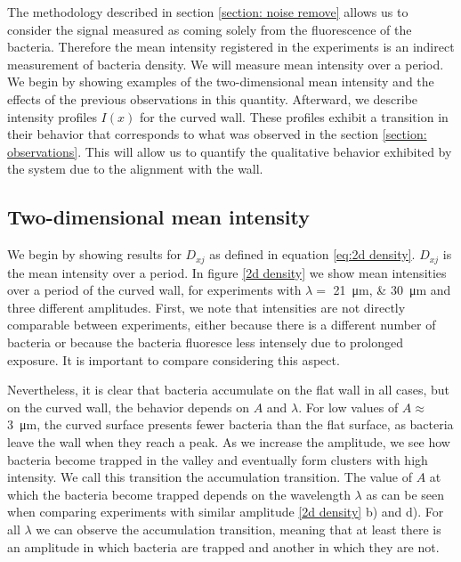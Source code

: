 The methodology described in section \ref{section: noise remove} allows us to consider the signal measured as coming solely from the fluorescence of the bacteria. Therefore the mean intensity registered in the experiments is an indirect measurement of bacteria density. We will measure mean intensity over a period. We begin by showing examples of the two-dimensional mean intensity and the effects of the previous observations in this quantity. Afterward, we describe intensity profiles $I(x)$ for the curved wall. These profiles exhibit a transition in their behavior that corresponds to what was observed in the section \ref{section: observations}. This will allow us to quantify the qualitative behavior exhibited by the system due to the alignment with the wall. 


\subsection{Two-dimensional mean intensity}

We begin by showing results for $D_{xj}$ as defined in equation \eqref{eq:2d density}. $D_{xj}$ is the mean intensity over a period. In figure \ref{2d density} we show mean intensities over a period of the curved wall, for experiments with $\lambda =$ \SIlist[list-units=single]{21;30}{\micro\meter} and three different amplitudes. First, we note that intensities are not directly comparable between experiments, either because there is a different number of bacteria or because the bacteria fluoresce less intensely due to prolonged exposure. It is important to compare considering this aspect.

Nevertheless, it is clear that bacteria accumulate on the flat wall in all cases, but on the curved wall, the behavior depends on $A$ and $\lambda$. For low values of $A\approx$ \SI{3}{\micro\meter}, the curved surface presents fewer bacteria than the flat surface, as bacteria leave the wall when they reach a peak. As we increase the amplitude, we see how bacteria become trapped in the valley and eventually form clusters with high intensity. We call this transition the accumulation transition. The value of $A$ at which the bacteria become trapped depends on the wavelength $\lambda$ as can be seen when comparing experiments with similar amplitude \ref{2d density} b) and d). For all $\lambda$ we can observe the accumulation transition, meaning that at least there is an amplitude in which bacteria are trapped and another in which they are not.

